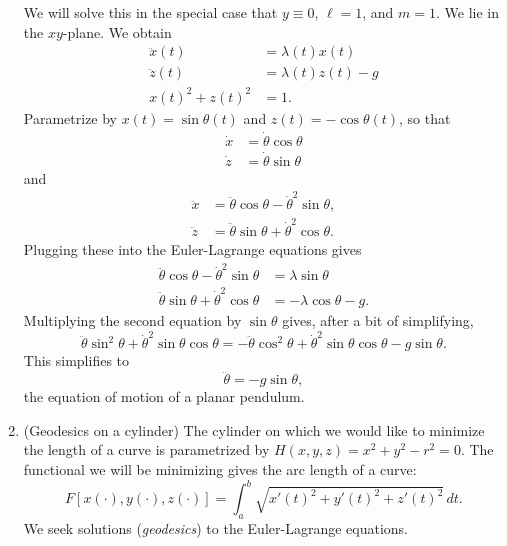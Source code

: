 \documentclass[11pt]{article}
\begin{document}
\begin{enumerate}
We will solve this in the special case that $y \equiv 0$, $\ell = 1$, and $m = 1$. We lie in the $xy$-plane. We obtain
\begin{align*}
\ddot{x}(t) &= \lambda(t)x(t) \\
\ddot{z}(t) &= \lambda(t)z(t) - g \\
x(t)^2 + z(t)^2 &= 1.
\end{align*}
Parametrize by $x(t) = \sin \theta(t)$ and $z(t) = -\cos \theta(t)$, so that
\begin{align*}
\dot{x} &= \dot{\theta} \cos \theta \\
\dot{z} &= \dot{\theta} \sin \theta
\end{align*}
and
\begin{align*}
\ddot{x} &= \ddot{\theta} \cos \theta - \dot{\theta}^2 \sin \theta, \\
\ddot{z} &= \ddot{\theta} \sin \theta + \dot{\theta}^2 \cos \theta.
\end{align*}
Plugging these into the Euler-Lagrange equations gives
\begin{align*}
\ddot{\theta} \cos \theta - \dot{\theta}^2 \sin \theta &= \lambda \sin \theta \\
\ddot{\theta} \sin \theta + \dot{\theta}^2 \cos\theta &= -\lambda \cos \theta - g.
\end{align*}
Multiplying the second equation by $\sin \theta$ gives, after a bit of simplifying,
\[
\ddot{\theta} \sin^2 \theta + \dot{\theta}^2 \sin \theta \cos \theta = -\ddot{\theta} \cos^2 \theta + \dot{\theta}^2 \sin \theta \cos \theta - g \sin \theta.
\]
This simplifies to
\[
\ddot{\theta} = -g \sin \theta,
\]
the equation of motion of a planar pendulum.

\item
(Geodesics on a cylinder) The cylinder on which we would like to minimize the length of a curve is parametrized by $H(x,y,z) = x^2 + y^2 - r^2 = 0$. The functional we will be minimizing gives the arc length of a curve:
\[
F[x(\cdot), y(\cdot), z(\cdot)] = \int_a^b \sqrt{x'(t)^2 + y'(t)^2 + z'(t)^2} \, dt.
\]
We seek solutions (\emph{geodesics}) to the Euler-Lagrange equations.


\end{enumerate}
\end{document}
